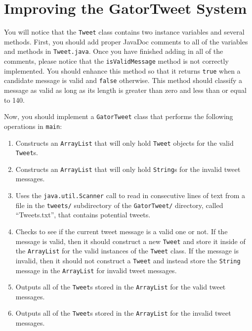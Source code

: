 \section*{Improving the GatorTweet System}

You will notice that the {\tt Tweet} class contains two instance variables and several methods.  First, you should add proper
JavaDoc comments to all of the variables and methods in {\tt Tweet.java}.  Once you have finished adding in all of the comments,
please notice that the {\tt isValidMessage} method is not correctly implemented.  You should enhance this method so that it
returns {\tt true} when a candidate message is valid and {\tt false} otherwise.  This method should classify a message as valid as
long as its length is greater than zero and less than or equal to 140.


Now, you should implement a {\tt GatorTweet} class that performs the following operations in {\tt main}:

\vspace*{-.1in}
\begin{enumerate}
  \item Constructs an {\tt ArrayList} that will only hold {\tt Tweet} objects for the valid {\tt Tweet}s.
  
  \item Constructs an {\tt ArrayList} that will only hold {\tt String}s for the invalid tweet messages.
  
  \item Uses the {\tt java.util.Scanner} call to read in consecutive lines of text from a file in the {\tt tweets/} subdirectory of
    the {\tt GatorTweet/} directory, called ``Tweets.txt'', that contains potential tweets.
  
  \item Checks to see if the current tweet message is a valid one or not.  If the message is valid, then it should construct a new
    {\tt Tweet} and store it inside of the {\tt ArrayList} for the valid instances of the {\tt Tweet} class.  If the message is
    invalid, then it should not construct a {\tt Tweet} and instead store the {\tt String} message in the {\tt ArrayList} for
    invalid tweet messages.

  \item Outputs all of the {\tt Tweet}s stored in the {\tt ArrayList} for the valid tweet messages. 

  \item Outputs all of the {\tt Tweet}s stored in the {\tt ArrayList} for the invalid tweet messages. 

\end{enumerate}

